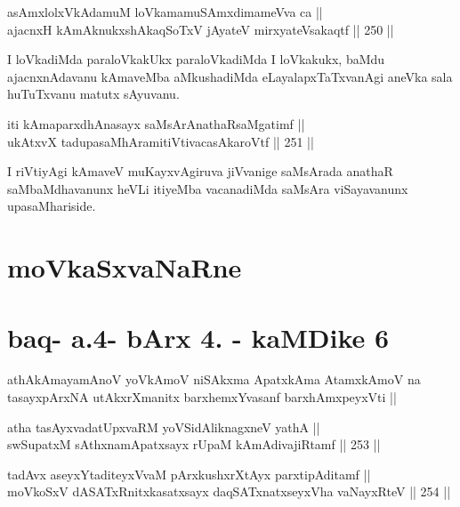 \begin{shl}
asAmxlolxVkAdamuM loVkamamuSAmxdimameVva ca || \\
ajacnxH kAmAknukxshAkaqSoTxV jAyateV mirxyateV\s sakaqtf \hfill || 250 ||  
\end{shl}

\begin{artha}
I loVkadiMda paraloVkakUkx paraloVkadiMda I loVkakukx, baMdu
ajacnxnAdavanu kAmaveMba aMkushadiMda eLayalapxTaTxvanAgi aneVka sala
huTuTxvanu matutx sAyuvanu.
\end{artha}

\begin{shl}
iti kAmaparxdhAnasayx saMsArAnathaRsaMgatimf || \\
ukAtxvX tadupasaMhAramitiVtivacasA\s karoVtf \hfill || 251 ||  
\end{shl}

\begin{artha}
I riVtiyAgi kAmaveV muKayxvAgiruva jiVvanige saMsArada anathaR
saMbaMdhavanunx heVLi itiyeMba vacanadiMda saMsAra viSayavanunx
upasaMhariside.
\end{artha}

\section*{moVkaSxvaNaRne}

\section*{baq- a.4- bArx 4. - kaMDike 6}

\begin{shl}
athAkAmayamAnoV yoV\s kAmoV niSAkxma ApatxkAma AtamxkAmoV na tasayxpArxNA utAkxrXmanitx barxhemxYvasanf barxhAmxpeyxVti ||
\end{shl}


\begin{shl}
atha tasAyxvadatUpxvaRM yoVSidAliknagxneV yathA || \\
swSupatxM sAthxnamApatxsayx rUpaM kAmAdivajiRtamf \hfill || 253 ||  
\end{shl}

\begin{shl}
tadAvx aseyxYtaditeyxVvaM pArxkushxrXtAyx parxtipAditamf || \\
moVkoSxV dASATxRnitxkasatxsayx daqSATxnatxseyxVha vaNayxRteV \hfill || 254 ||   
\end{shl}

